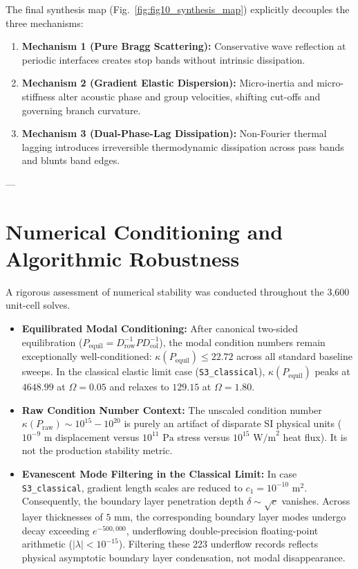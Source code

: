 \documentclass[11pt,a4paper]{article}
\begin{document}
The final synthesis map (Fig.~\ref{fig:fig10_synthesis_map}) explicitly decouples the three mechanisms:
\begin{enumerate}
    \item \textbf{Mechanism 1 (Pure Bragg Scattering):} Conservative wave reflection at periodic interfaces creates stop bands without intrinsic dissipation.
    \item \textbf{Mechanism 2 (Gradient Elastic Dispersion):} Micro-inertia and micro-stiffness alter acoustic phase and group velocities, shifting cut-offs and governing branch curvature.
    \item \textbf{Mechanism 3 (Dual-Phase-Lag Dissipation):} Non-Fourier thermal lagging introduces irreversible thermodynamic dissipation across pass bands and blunts band edges.
\end{enumerate}

---

\section{Numerical Conditioning and Algorithmic Robustness}
\label{sec:conditioning}

A rigorous assessment of numerical stability was conducted throughout the 3,600 unit-cell solves.
\begin{itemize}
    \item \textbf{Equilibrated Modal Conditioning:} After canonical two-sided equilibration ($P_{\text{equil}} = D_{\text{row}}^{-1} P D_{\text{col}}^{-1}$), the modal condition numbers remain exceptionally well-conditioned: $\kappa(P_{\text{equil}}) \le 22.72$ across all standard baseline sweeps. In the classical elastic limit case (\texttt{S3\_classical}), $\kappa(P_{\text{equil}})$ peaks at $4648.99$ at $\Omega = 0.05$ and relaxes to $129.15$ at $\Omega = 1.80$.
    \item \textbf{Raw Condition Number Context:} The unscaled condition number $\kappa(P_{\text{raw}}) \sim 10^{15} - 10^{20}$ is purely an artifact of disparate SI physical units ($10^{-9}\text{ m}$ displacement versus $10^{11}\text{ Pa}$ stress versus $10^{15}\text{ W/m}^2$ heat flux). It is not the production stability metric.
    \item \textbf{Evanescent Mode Filtering in the Classical Limit:} In case \texttt{S3\_classical}, gradient length scales are reduced to $c_1 = 10^{-10}\text{ m}^2$. Consequently, the boundary layer penetration depth $\delta \sim \sqrt{c}$ vanishes. Across layer thicknesses of $5\text{ mm}$, the corresponding boundary layer modes undergo decay exceeding $e^{-500,000}$, underflowing double-precision floating-point arithmetic ($|\lambda| < 10^{-15}$). Filtering these 223 underflow records reflects physical asymptotic boundary layer condensation, not modal disappearance.
\end{itemize}
\end{document}

